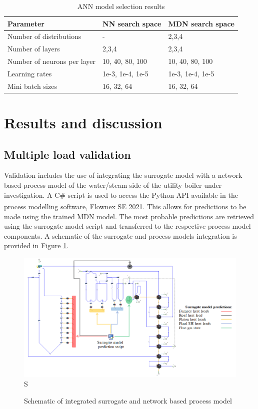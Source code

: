 \documentclass[a4paper,fleqn]{cas-sc}
\begin{document}
\begin{table}[h!]
\caption{ANN model selection results}\label{tbl_tuning}
\begin{tabular*}{\tblwidth}{p{}p{}p{}}
\toprule
 Parameter& NN search space & MDN search space \\ %
\midrule
 Number of distributions & - & 2,3,4  \\
 Number of layers & 2,3,4 & 2,3,4\\
 Number of neurons per layer & 10, 40, 80, 100  & 10, 40, 80, 100\\
 Learning rates & 1e-3, 1e-4, 1e-5 &  1e-3, 1e-4, 1e-5   \\
 Mini batch sizes  & 16, 32, 64 & 16, 32, 64  \\
\bottomrule
\end{tabular*}
\end{table}

\section{Results and discussion}
\subsection{Multiple load validation}

Validation includes the use of integrating the surrogate model with a network based-process model of the water/steam side of the utility boiler under investigation. A C\# script is used to access the Python API available in the process modelling software, Flownex SE\textsuperscript{\textregistered} 2021. This allows for predictions to be made using the trained MDN model. The most probable predictions are retrieved using the surrogate model script and transferred to the respective process model components. A schematic of the surrogate and process models integration is provided in Figure \ref{fig_int_model}.

\begin{figure}[h!]
	\centering
		\includegraphics[scale=0.65]{INTEGRATED_MODEL}S
	  \caption{Schematic of integrated surrogate and network based process model}\label{fig_int_model}
\end{figure}
\end{document}
